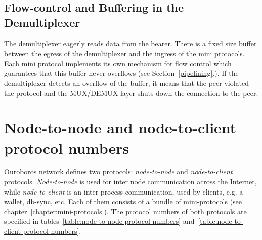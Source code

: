 \subsection{Flow-control and Buffering in the Demultiplexer}
\label{mux-flow-control}
The demultiplexer eagerly reads data from the bearer.
There is a fixed size buffer between the egress of the demultiplexer and the ingress of
the mini protocols.
Each mini protocol implements its own mechanism for flow control which guarantees that this buffer
never overflows (see Section~\ref{pipelining}.).
If the demultiplexer detects an overflow of the buffer, it means that the peer violated the
protocol and the MUX/DEMUX layer shuts down the connection to the peer.


\section{Node-to-node and node-to-client protocol numbers}
\noindent{}
\newline{}
\newline{}

Ouroboros network defines two protocols: \emph{node-to-node} and
\emph{node-to-client} protocols.  \emph{Node-to-node} is used for inter node
communication across the Internet, while \emph{node-to-client} is an inter
process communication, used by clients, e.g. a wallet, db-sync, etc.  Each of them consists of a bundle of mini-protocols (see chapter~\ref{chapter:mini-protocols}).
The protocol numbers of both protocols
are specified in tables~\ref{table:node-to-node-protocol-numbers}
and~\ref{table:node-to-client-protocol-numbers}.
